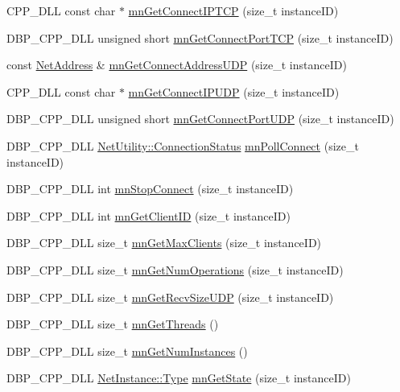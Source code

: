 \begin{DoxyCompactItemize}
\item 
CPP\_\-DLL const char $\ast$ \hyperlink{group__proc_commands_ga083b63339c2f42778cbdf19f677055fe}{mnGetConnectIPTCP} (size\_\-t instanceID)
\item 
DBP\_\-CPP\_\-DLL unsigned short \hyperlink{group__proc_commands_ga6dee9379f99fb78a9513349cabd4ea05}{mnGetConnectPortTCP} (size\_\-t instanceID)
\item 
const \hyperlink{class_net_address}{NetAddress} \& \hyperlink{group__proc_commands_ga98684f25ae6e70672236a61bad79046e}{mnGetConnectAddressUDP} (size\_\-t instanceID)
\item 
CPP\_\-DLL const char $\ast$ \hyperlink{group__proc_commands_ga302bfaa47c6aed08e0edc0b5c5a1e093}{mnGetConnectIPUDP} (size\_\-t instanceID)
\item 
DBP\_\-CPP\_\-DLL unsigned short \hyperlink{group__proc_commands_ga469a2d1aab2e3ed994c18fefb33eea56}{mnGetConnectPortUDP} (size\_\-t instanceID)
\item 
DBP\_\-CPP\_\-DLL \hyperlink{class_net_utility_a7eae52138f8bd597ffc67ebf07e86b6d}{NetUtility::ConnectionStatus} \hyperlink{group__proc_commands_gadf0357210e9ea8ed418b9507df861604}{mnPollConnect} (size\_\-t instanceID)
\item 
DBP\_\-CPP\_\-DLL int \hyperlink{group__proc_commands_gad549e29ca5e200d6d690a4941a570305}{mnStopConnect} (size\_\-t instanceID)
\item 
DBP\_\-CPP\_\-DLL int \hyperlink{group__proc_commands_ga825c196d663945fe6d1f7e8eaad2313e}{mnGetClientID} (size\_\-t instanceID)
\item 
DBP\_\-CPP\_\-DLL size\_\-t \hyperlink{group__proc_commands_ga4fa1fbbae8da05c5c3e90541a935637e}{mnGetMaxClients} (size\_\-t instanceID)
\item 
DBP\_\-CPP\_\-DLL size\_\-t \hyperlink{group__proc_commands_ga0563d35ebbd393497e421c4580ab1415}{mnGetNumOperations} (size\_\-t instanceID)
\item 
DBP\_\-CPP\_\-DLL size\_\-t \hyperlink{group__proc_commands_gaddd3740aec26e31092bc983bdcfa2bc9}{mnGetRecvSizeUDP} (size\_\-t instanceID)
\item 
DBP\_\-CPP\_\-DLL size\_\-t \hyperlink{group__proc_commands_ga0f58a68488b9564841b09e483c38c556}{mnGetThreads} ()
\item 
DBP\_\-CPP\_\-DLL size\_\-t \hyperlink{group__proc_commands_ga6359d2db10828ddbf0eca0f10ca86b95}{mnGetNumInstances} ()
\item 
DBP\_\-CPP\_\-DLL \hyperlink{class_net_instance_a0ec01a76d9b78794cfbdeab10a436cdc}{NetInstance::Type} \hyperlink{group__proc_commands_gad17f849ecac289f110936b76a2d0289f}{mnGetState} (size\_\-t instanceID)

\end{DoxyCompactItemize}
